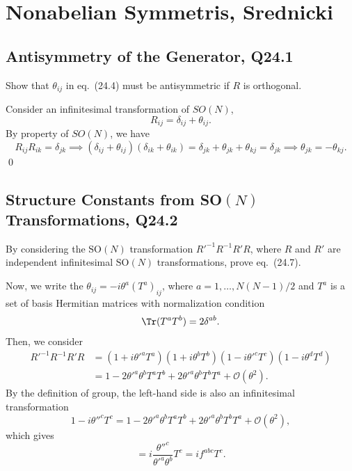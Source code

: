 \section{Nonabelian Symmetris, Srednicki}
\subsection{Antisymmetry of the Generator, Q24.1}

Show that $\theta_{ij}$ in eq.~(24.4) must be antisymmetric if $R$ is orthogonal.
\begin{solution}
    Consider an infinitesimal transformation of $SO(N)$,
    \begin{equation}
        R_{ij} = \delta_{ij} + \theta_{ij}.
    \end{equation}
    By property of $SO(N)$, we have
    \begin{equation}
        R_{ij}R_{ik} = \delta_{jk} \implies(\delta_{ij} + \theta_{ij})(\delta_{ik} + \theta_{ik})  = \delta_{jk} + \theta_{jk} + \theta_{kj} = \delta_{jk} \implies \theta_{jk} = -\theta_{kj}.
    \end{equation}
    \qed
\end{solution}

\subsection{Structure Constants from SO$(N)$ Transformations, Q24.2}

By considering the $\mathrm{SO}(N)$ transformation $R'^{-1}R^{-1}R'R$, where $R$ and $R'$ are independent infinitesimal $\mathrm{SO}(N)$ transformations, prove eq.~(24.7).
\begin{solution}
    Now, we write the $\theta_{ij} = -i\theta^a(T^a)_{ij}$, where $a = 1, \dots , N(N-1)/2$ and $T^a$ is a set of basis Hermitian matrices with normalization condition
    \begin{equation}
        \Tr(T^aT^b) = 2\delta^{ab}. 
    \end{equation}
    Then, we consider 
    \begin{equation}
    \begin{aligned}
        R'^{-1}R^{-1}R'R &= (1+i\theta'^aT^a)(1+i\theta^bT^b)(1-i\theta'^cT^c)(1-i\theta^dT^d)\\
        &=1 - 2\theta'^a\theta^bT^aT^b + 2\theta'^a\theta^bT^bT^a + \mathcal{O}(\theta^2).
    \end{aligned}
    \end{equation}
    By the definition of group, the left-hand side is also an infinitesimal transformation
    \begin{equation}
        1 - i\theta''^cT^c = 1 - 2\theta'^a\theta^bT^aT^b + 2\theta'^a\theta^bT^bT^a + \mathcal{O}(\theta^2),
    \end{equation}
    which gives
    \begin{equation}
        [T^a, T^b] =  i\frac{\theta''^c}{\theta'^a\theta^b}T^c = i f^{abc}T^c.
    \end{equation}
\end{solution}

